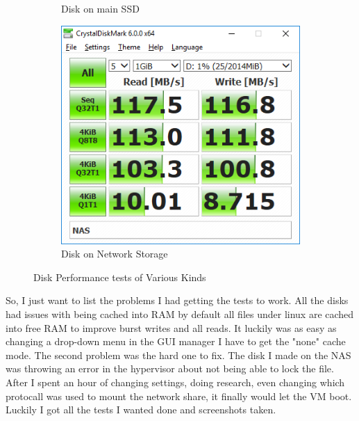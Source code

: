 \documentclass[12pt]{article}
\begin{document}
\begin{figure}[!ht]
\begin{subfigure}[t]{0.45\textwidth}
		\caption{Disk on main SSD}
	\end{subfigure}
	\begin{subfigure}[t]{0.45\textwidth}
		\includegraphics[width=\textwidth]{nas.png}
		\caption{Disk on Network Storage}
	\end{subfigure}
	\caption{Disk Performance tests of Various Kinds}
	\label{fig:disk_performance}
\end{figure}

So, I just want to list the problems I had getting the tests to work.
All the disks had issues with being cached into RAM by default all files under linux are cached into free RAM to improve burst writes and all reads.
It luckily was as easy as changing a drop-down menu in the GUI manager I have to get the "none" cache mode.
The second problem was the hard one to fix.
The disk I made on the NAS was throwing an error in the hypervisor about not being able to lock the file.
After I spent an hour of changing settings, doing research, even changing which protocall was used to mount the network share, it finally would let the VM boot.
Luckily I got all the tests I wanted done and screenshots taken.
\end{document}
